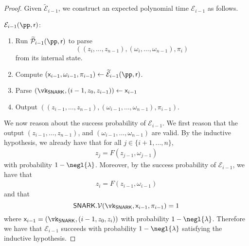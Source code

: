 \begin{proof}
   Given $\widetilde{\mathcal{E}}_{i - 1}$, 
   we construct an expected polynomial time $\mathcal{E}_{i - 1}$ as follows.
 
 
   \begin{mdframed}[nobreak=true]
   \noindent \underline{$\mathcal{E}_{i - 1}(\pp, \mathsf{r})$}: 
   \begin{enumerate}
     \item Run $\widetilde{\Po}_{i - 1}(\pp, \mathsf{r})$
     to parse
     \[
     ((z_i, \ldots, z_{n - 1}), (\omega_i, \ldots, \omega_{n -
     1}), \pi_i)
     \]
     from its internal state.
     \item Compute $(\io_{i - 1}, \omega_{i - 1}, \pi_{i - 1}) \gets \widetilde{\mathcal{E}}_{i - 1}(\pp, \mathsf{r})$.
     \item Parse $(\vk_\snark, (i - 1, z_0, z_{i - 1})) \gets \io_{i - 1}$
     \item Output $((z_{i - 1}, \ldots, z_{n - 1}), (\omega_{i - 1}, \ldots, \omega_{n - 1}), \pi_{i - 1})$. 
   \end{enumerate}
 \end{mdframed}
 
  We now reason about the success probability of $\mathcal{E}_{i - 1}$.
   We first reason that the output $(z_{i - 1}, \ldots, z_{n - 1})$, and
   $(\omega_{i - 1}, \ldots, \omega_{n - 1})$ are valid.
   By the inductive hypothesis, 
   we already have that for all $j \in \{i + 1, \ldots, n\}$,
   \begin{align*}
     z_j = F(z_{j - 1}, \omega_{j - 1})
   \end{align*}
   with probability $1 - \negl{\lambda}$.
   Moreover,
   by the success probability of $\mathcal{E}_{i - 1}$,
   we have that
   \begin{align*}
     z_{i} = F(z_{i - 1}, \omega_{i - 1})
   \end{align*}
   and that
   \[
   \snark.\V(\vk_\snark, \io_{i - 1}, \pi_{i - 1}) = 1
   \]
   where $\io_{i - 1} = (\vk_\snark, (i - 1, z_0, z_i))$
   with probability $1 - \negl{\lambda}$.
   Therefore we have that $\mathcal{E}_{i - 1}$
   succeeds with probability $1 - \negl{\lambda}$
   satisfying the inductive hypothesis.
 \end{proof} 

% 
% 
